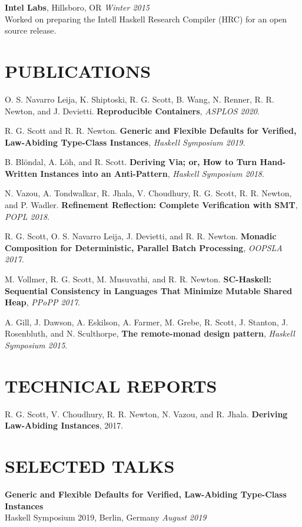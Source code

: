 \documentclass{res}
\begin{document}
\begin{resume}
    \textbf{Intel Labs}, Hillsboro, OR \hfill \textit{Winter 2015} \\
    Worked on preparing the Intell Haskell Research Compiler (HRC) for an open source release.

\section{PUBLICATIONS}
    O. S. Navarro Leija, K. Shiptoski, R. G. Scott, B. Wang, N. Renner, R. R. Newton, and J. Devietti. \textbf{Reproducible Containers}, \textit{ASPLOS 2020}.

    R. G. Scott and R. R. Newton. \textbf{Generic and Flexible Defaults for Verified, Law-Abiding Type-Class Instances}, \textit{Haskell Symposium 2019}.

    B. Blöndal, A. Löh, and R. Scott. \textbf{Deriving Via; or, How to Turn Hand-Written Instances into an Anti-Pattern}, \textit{Haskell Symposium 2018}.

    N. Vazou, A. Tondwalkar, R. Jhala, V. Choudhury, R. G. Scott, R. R. Newton, and P. Wadler. \textbf{Refinement Reflection: Complete Verification with SMT}, \textit{POPL 2018}.

    R. G. Scott, O. S. Navarro Leija, J. Devietti, and R. R. Newton. \textbf{Monadic Composition for Deterministic, Parallel Batch Processing}, \textit{OOPSLA 2017}.

    M. Vollmer, R. G. Scott, M. Musuvathi, and R. R. Newton. \textbf{SC-Haskell: Sequential Consistency in Languages That Minimize Mutable Shared Heap}, \textit{PPoPP 2017}.

    A. Gill, J. Dawson, A. Eskilson, A. Farmer, M. Grebe, R. Scott, J. Stanton, J. Rosenbluth, and N. Sculthorpe, \textbf{The remote-monad design pattern}, \textit{Haskell Symposium 2015}.


\section{TECHNICAL REPORTS}
    R. G. Scott, V. Choudhury, R. R. Newton, N. Vazou, and R. Jhala. \textbf{Deriving Law-Abiding Instances}, 2017.

\section{SELECTED TALKS}
    \textbf{Generic and Flexible Defaults for Verified, Law-Abiding Type-Class Instances} \hfill \\
    Haskell Symposium 2019, Berlin, Germany \hfill \textit{August 2019}


\end{resume}
\end{document}
